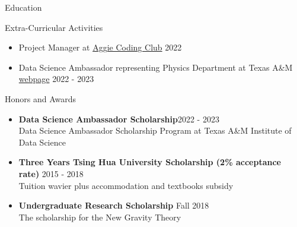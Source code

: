 \documentclass{resume}
\begin{document}
\begin{rSection}{Education}
\begin{rSection}{Extra-Curricular Activities}
\begin{itemize}
    \item Project Manager at \href{https://aggiecodingclub.com/}{Aggie Coding Club} \hfill 2022
    \item Data Science Ambassador representing Physics Department at Texas A\&M \href{https://noctildon.github.io/DS_ambassador/index.html}{webpage} \hfill 2022 - 2023
\end{itemize}
\end{rSection}


\begin{rSection}{Honors and Awards}
    \begin{itemize}
        \item \textbf{Data Science Ambassador Scholarship}\hfill 2022 - 2023\\
        Data Science Ambassador Scholarship Program at Texas A\&M Institute of Data Science
        \item \textbf{Three Years Tsing Hua University Scholarship (2\% acceptance rate)} \hfill 2015 - 2018 \\
        Tuition wavier plus accommodation and textbooks subsidy
        \item \textbf{Undergraduate Research Scholarship} \hfill Fall 2018 \\
        The scholarship for the New Gravity Theory
    \end{itemize}
\end{rSection}

\end{rSection}
\end{document}
